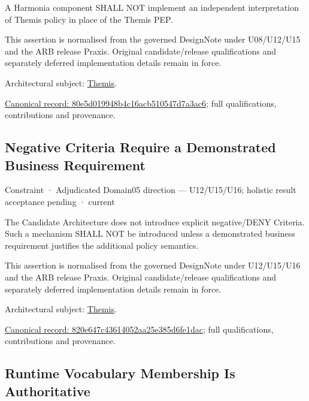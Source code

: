 A Harmonia component SHALL NOT implement an independent interpretation of Themis policy in place of the Themis PEP.



This assertion is normalised from the governed DesignNote under U08/U12/U15 and the ARB release Praxis. Original candidate/release qualifications and separately deferred implementation details remain in force.



Architectural subject: \hyperref[element:899d34ec491948b68aad09e507dea6d1]{Themis}.


{\footnotesize \href{../../../../continuum/motivation/constraint/80e5d019948b4c16acb510547d7a3ac6.md}{Canonical record: 80e5d019948b4c16acb510547d7a3ac6}; full qualifications, contributions and provenance.}\par
\subsection{Negative Criteria Require a Demonstrated Business Requirement}

\label{element:820e647c43614052aa25e385d6fe1dac}
{\small Constraint · Adjudicated Domain05 direction — U12/U15/U16; holistic result acceptance pending · current}\par

The Candidate Architecture does not introduce explicit negative/DENY Criteria. Such a mechanism SHALL NOT be introduced unless a demonstrated business requirement justifies the additional policy semantics.



This assertion is normalised from the governed DesignNote under U12/U15/U16 and the ARB release Praxis. Original candidate/release qualifications and separately deferred implementation details remain in force.



Architectural subject: \hyperref[element:899d34ec491948b68aad09e507dea6d1]{Themis}.


{\footnotesize \href{../../../../continuum/motivation/constraint/820e647c43614052aa25e385d6fe1dac.md}{Canonical record: 820e647c43614052aa25e385d6fe1dac}; full qualifications, contributions and provenance.}\par
\subsection{Runtime Vocabulary Membership Is Authoritative}

